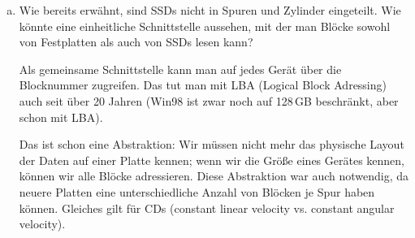 \begin{enumerate}[a)]
	\item Wie bereits erwähnt, sind SSDs nicht in Spuren und Zylinder eingeteilt.
	Wie könnte eine einheitliche Schnittstelle aussehen, mit der man Blöcke sowohl von Festplatten als auch von SSDs lesen kann?

	\begin{solution}
	Als gemeinsame Schnittstelle kann man auf jedes Gerät über die Blocknummer zugreifen.
	Das tut man mit LBA (Logical Block Adressing) auch seit über 20 Jahren (Win98 ist zwar noch auf 128\,GB beschränkt, aber schon mit LBA).

	Das ist schon eine Abstraktion: Wir müssen nicht mehr das physische Layout der Daten auf einer Platte kennen; wenn wir die Größe eines Gerätes kennen, können wir alle Blöcke adressieren.
	Diese Abstraktion war auch notwendig, da neuere Platten eine unterschiedliche Anzahl von Blöcken je Spur haben können.
	Gleiches gilt für CDs (constant linear velocity vs. constant angular velocity).
	\end{solution}
\end{enumerate}
